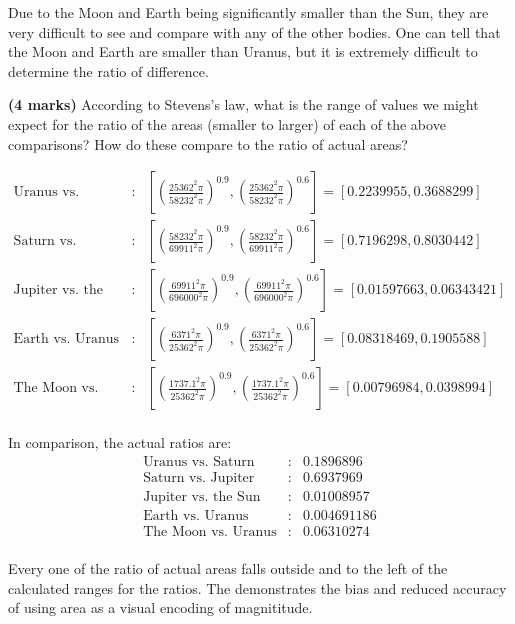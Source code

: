 \documentclass[9pt,letter]{article}
\begin{document}
Due to the Moon and Earth being significantly smaller than the Sun, they
are very difficult to see and compare with any of the other bodies. One
can tell that the Moon and Earth are smaller than Uranus, but it is
extremely difficult to determine the ratio of difference.

\item 

\textbf{(4 marks)} According to Stevens's law, what is the range of
values we might expect for the ratio of the areas (smaller to larger) of
each of the above comparisons? How do these compare to the ratio of
actual areas?

\[
\begin{array}{rll}
\text{Uranus vs. Saturn} &:& \displaystyle [(\frac{25362^2\pi}{58232^2\pi})^{0.9}, (\frac{25362^2\pi}{58232^2\pi})^{0.6}] = [0.2239955, 0.3688299]\\
\text{Saturn vs. Jupiter} &:& \displaystyle [(\frac{58232^2\pi}{69911^2\pi})^{0.9}, (\frac{58232^2\pi}{69911^2\pi})^{0.6}] = [0.7196298, 0.8030442]\\
\text{Jupiter vs. the Sun} &:& \displaystyle [(\frac{69911^2\pi}{696000^2\pi})^{0.9}, (\frac{69911^2\pi}{696000^2\pi})^{0.6}] = [0.01597663,0.06343421]\\
\text{Earth vs. Uranus} &:& \displaystyle [(\frac{6371^2\pi}{25362^2\pi})^{0.9}, (\frac{6371^2\pi}{25362^2\pi})^{0.6}] = [0.08318469, 0.1905588]\\
\text{The Moon vs. Uranus} &:& \displaystyle [(\frac{1737.1^2\pi}{25362^2\pi})^{0.9}, (\frac{1737.1^2\pi}{25362^2\pi})^{0.6}] = [0.00796984, 0.0398994]\\
\end{array}
\]

In comparison, the actual ratios are: \[
\begin{array}{rll}
\text{Uranus vs. Saturn} &:& 0.1896896\\
\text{Saturn vs. Jupiter} &:& 0.6937969\\
\text{Jupiter vs. the Sun} &:& 0.01008957\\
\text{Earth vs. Uranus} &:& 0.004691186\\
\text{The Moon vs. Uranus} &:& 0.06310274\\
\end{array}
\]

Every one of the ratio of actual areas falls outside and to the left of
the calculated ranges for the ratios. The demonstrates the bias and
reduced accuracy of using area as a visual encoding of magnititude.
\end{document}
